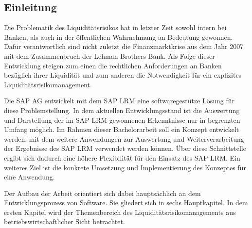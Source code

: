 
\listoftodos


\begin{onehalfspacing}

\chapter{Einleitung}

Die Problematik des Liquiditätsrisikos hat in letzter Zeit sowohl intern bei Banken, als auch in der öffentlichen Wahrnehmung an Bedeutung gewonnen. Dafür verantwortlich sind nicht zuletzt die Finanzmarktkrise aus dem Jahr 2007 mit dem Zusammenbruch der Lehman Brothers Bank. Als Folge dieser Entwicklung steigen zum einen die rechtlichen Anforderungen an Banken bezüglich ihrer Liquidität und zum anderen die Notwendigkeit für ein explizites Liquiditätsrisikomanagement. 

Die SAP AG entwickelt mit dem SAP LRM eine softwaregestütze Lösung für diese Problemstellung. In dem aktuellen Entwicklungsstand ist die Auswertung und Darstellung der im SAP LRM gewonnenen Erkenntnisse nur in begrenzten Umfang möglich. Im Rahmen dieser Bachelorarbeit soll ein Konzept entwickelt werden, mit dem weitere Anwendungen zur Auswertung und Weiterverarbeitung der Ergebnisse des SAP LRM verwendet werden können. Über diese Schnittstelle ergibt sich dadurch eine höhere Flexibilität für den Einsatz des SAP LRM. Ein weiteres Ziel ist die konkrete Umsetzung und Implementierung des Konzeptes für eine Anwendung.

Der Aufbau der Arbeit orientiert sich dabei hauptsächlich an dem Entwicklungsprozess von Software. Sie gliedert sich in sechs Hauptkapitel. In dem ersten Kapitel wird der Themenbereich des Liquiditätsrisikomanagements aus betriebswirtschaftlicher Sicht betrachtet.


\end{onehalfspacing}
